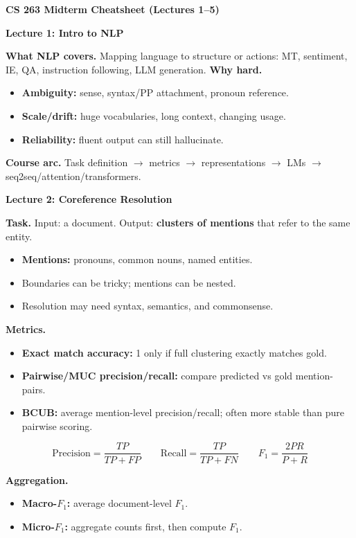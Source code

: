 \documentclass[letterpaper,landscape]{article}
\newcommand{\secbar}[1]{\vspace{1pt}\colorbox{black!12}{\parbox{\linewidth}{\textbf{#1}}}\vspace{1pt}}
\newcommand{\mini}[1]{\textbf{#1}}
\newcommand{\eqline}[1]{\[
\displaystyle #1
\]}
\begin{document}
\raggedright
\sloppy
\fontsize{6.15}{6.45}\selectfont

{\centering \textbf{CS 263 Midterm Cheatsheet (Lectures 1--5)}\par}
\vspace{2pt}

\begin{minipage}[t]{0.325\textwidth}\vspace{0pt}
\secbar{Lecture 1: Intro to NLP}
\mini{What NLP covers.} Mapping language to structure or actions: MT, sentiment, IE, QA, instruction following, LLM generation.
\mini{Why hard.}
\begin{itemize}
\item \textbf{Ambiguity:} sense, syntax/PP attachment, pronoun reference.
\item \textbf{Scale/drift:} huge vocabularies, long context, changing usage.
\item \textbf{Reliability:} fluent output can still hallucinate.
\end{itemize}
\mini{Course arc.} Task definition $\rightarrow$ metrics $\rightarrow$ representations $\rightarrow$ LMs $\rightarrow$ seq2seq/attention/transformers.

\secbar{Lecture 2: Coreference Resolution}
\mini{Task.} Input: a document. Output: \textbf{clusters of mentions} that refer to the same entity.
\begin{itemize}
\item \textbf{Mentions:} pronouns, common nouns, named entities.
\item Boundaries can be tricky; mentions can be nested.
\item Resolution may need syntax, semantics, and commonsense.
\end{itemize}

\mini{Metrics.}
\begin{itemize}
\item \textbf{Exact match accuracy:} 1 only if full clustering exactly matches gold.
\item \textbf{Pairwise/MUC precision/recall:} compare predicted vs gold mention-pairs.
\item \textbf{BCUB:} average mention-level precision/recall; often more stable than pure pairwise scoring.
\end{itemize}
\eqline{\mathrm{Precision}=\frac{TP}{TP+FP}\qquad
\mathrm{Recall}=\frac{TP}{TP+FN}\qquad
F_1=\frac{2PR}{P+R}}

\mini{Aggregation.}
\begin{itemize}
\item \textbf{Macro-$F_1$:} average document-level $F_1$.
\item \textbf{Micro-$F_1$:} aggregate counts first, then compute $F_1$.
\end{itemize}


\end{minipage}
\end{document}
